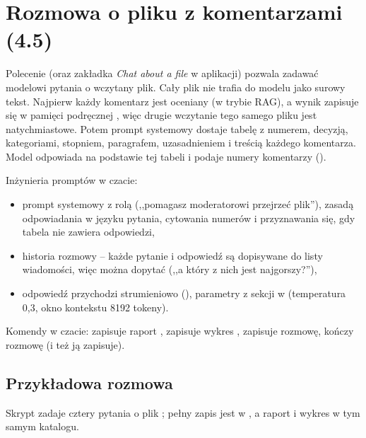 \newpage
\section{Rozmowa o pliku z komentarzami (4.5)}
\label{sec:czat}

Polecenie  (oraz zakładka \emph{Chat about a file} w aplikacji) pozwala zadawać
modelowi pytania o wczytany plik. Cały plik nie trafia do modelu jako surowy tekst. Najpierw każdy komentarz jest
oceniany (w trybie RAG), a wynik zapisuje się w pamięci podręcznej , więc drugie wczytanie tego
samego pliku jest natychmiastowe. Potem prompt systemowy dostaje tabelę z numerem, decyzją, kategoriami, stopniem,
paragrafem, uzasadnieniem i treścią każdego komentarza. Model odpowiada na podstawie tej tabeli i podaje numery
komentarzy ().

Inżynieria promptów w czacie:
\begin{itemize}
  \item prompt systemowy z rolą (,,pomagasz moderatorowi przejrzeć plik''), zasadą odpowiadania w języku pytania,
        cytowania numerów i przyznawania się, gdy tabela nie zawiera odpowiedzi,
  \item historia rozmowy -- każde pytanie i odpowiedź są dopisywane do listy wiadomości, więc można dopytać
        (,,a który z nich jest najgorszy?''),
  \item odpowiedź przychodzi strumieniowo (), parametry z sekcji  w 
        (temperatura 0,3, okno kontekstu 8192 tokeny).
\end{itemize}

Komendy w czacie:  zapisuje raport ,  zapisuje wykres ,
 zapisuje rozmowę,  kończy rozmowę (i też ją zapisuje).


\subsection{Przykładowa rozmowa}

Skrypt  zadaje cztery pytania o plik ; pełny zapis jest
w , a raport i wykres w tym samym katalogu.

